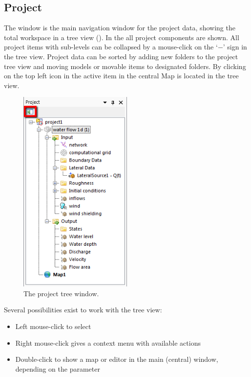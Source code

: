 \subsection{Project}
\label{subsec:project}
The  window is the main navigation window for the project data, showing the total workspace in a tree view (). In the  all project components are shown. 
%
All project items with sub-levels can be collapsed by a mouse-click on the `$-$' sign in the tree view. Project data can be sorted by adding new folders to the project tree view and moving models or movable items to designated folders.
%
By clicking on the top left icon in  the active item in the central Map is located in the tree view.
%
\begin{figure} [H]
	\centering
		\includegraphics[width=0.5\textwidth]{Figures/Chapter_overview/view_project_window.png}
	\caption{The project tree window.}
	\label{fig:fig2.2}
\end{figure}
%
Several possibilities exist to work with the tree view:
%
\begin{itemize}
	\item Left mouse-click to select
	\item Right mouse-click gives a context menu with available actions
	\item Double-click to show a map or editor in the main (central) window, depending on the parameter
\end{itemize}
%
